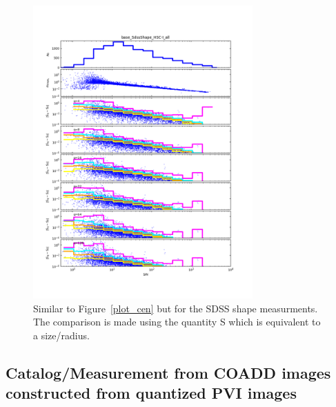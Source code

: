 \begin{figure}
\centering
\includegraphics[width=0.75\textwidth]{figure/rplot_all_base_SdssShape_HSC-I.png}
\caption{Similar to Figure~\ref{plot_cen} but for the SDSS shape measurments.  The comparison is made using the quantity S which is equivalent to
a size/radius.}
\label{plot_shape}
\end{figure}




\subsection{Catalog/Measurement from COADD images constructed from quantized PVI images}


